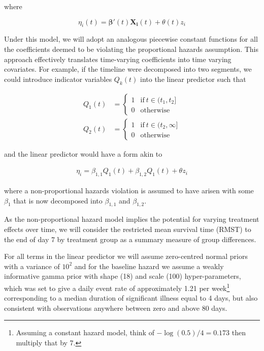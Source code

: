 \documentclass[a4paper]{article}
\begin{document}
where

\begin{equation}
\eta_i(t) = \boldsymbol{\beta}'(t) \boldsymbol{X_i}(t) + \theta(t) z_i
\end{equation}

Under this model, we will adopt an analogous piecewise constant functions for all the coefficients deemed to be violating the proportional hazards assumption.
This approach effectively translates time-varying coefficients into time varying covariates.
For example, if the timeline were decomposed into two segments, we could introduce indicator variables $Q_k(t)$ into the linear predictor such that 

\begin{align*}
Q_1(t) &= \begin{cases}
      1 & \text{if}\ t \in (t_1, t_2] \\
      0 & \text{otherwise}
    \end{cases} \\
Q_2(t) &= \begin{cases}
      1 & \text{if}\ t \in (t_2, \infty] \\
      0 & \text{otherwise}
    \end{cases}    
\end{align*}

and the linear predictor would have a form akin to 

\begin{align*}
\eta_i = \beta_{1, 1} Q_1(t) + \beta_{1, 2} Q_1(t) + \theta z_i
\end{align*}

where a non-proportional hazards violation is assumed to have arisen with some $\beta_1$ that is now decomposed into $\beta_{1, 1}$ and $\beta_{1, 2}$.

As the non-proportional hazard model implies the potential for varying treatment effects over time, we will consider the restricted mean survival time (RMST) to the end of day 7 by treatment group as a summary measure of group differences.

For all terms in the linear predictor we will assume zero-centred normal priors with a variance of $10^2$ and for the baseline hazard we assume a weakly informative gamma prior with shape (18) and scale (100) hyper-parameters, which was set to give a daily event rate of approximately 1.21 per week\footnote{Assuming a constant hazard model, think of $-\log(0.5)/4 = 0.173$ then multiply that by 7.} corresponding to a median duration of significant illness equal to 4 days, but also consistent with observations anywhere between zero and above 80 days.
\end{document}
